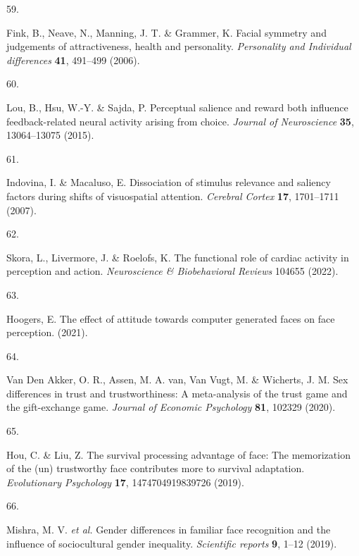 \documentclass[
  man,floatsintext]{apa6}
\newlength{\cslhangindent}
\newlength{\csllabelwidth}
\newlength{\cslentryspacingunit} %
\newenvironment{CSLReferences}[2] %
 {%
  \setlength{\parindent}{0pt}
  \ifodd #1
  \let\oldpar\par
  \def\par{\hangindent=\cslhangindent\oldpar}
  \fi
  \setlength{\parskip}{#2\cslentryspacingunit}
 }%
 {}
\newcommand{\CSLLeftMargin}[1]{\parbox[t]{\csllabelwidth}{#1}}
\newcommand{\CSLRightInline}[1]{\parbox[t]{\linewidth - \csllabelwidth}{#1}\break}
\begin{document}
\begin{CSLReferences}{0}{0}
\leavevmode{}%
\CSLLeftMargin{59. }%
\CSLRightInline{Fink, B., Neave, N., Manning, J. T. \& Grammer, K. Facial symmetry and judgements of attractiveness, health and personality. \emph{Personality and Individual differences} \textbf{41}, 491--499 (2006).}

\leavevmode{}%
\CSLLeftMargin{60. }%
\CSLRightInline{Lou, B., Hsu, W.-Y. \& Sajda, P. Perceptual salience and reward both influence feedback-related neural activity arising from choice. \emph{Journal of Neuroscience} \textbf{35}, 13064--13075 (2015).}

\leavevmode{}%
\CSLLeftMargin{61. }%
\CSLRightInline{Indovina, I. \& Macaluso, E. Dissociation of stimulus relevance and saliency factors during shifts of visuospatial attention. \emph{Cerebral Cortex} \textbf{17}, 1701--1711 (2007).}

\leavevmode{}%
\CSLLeftMargin{62. }%
\CSLRightInline{Skora, L., Livermore, J. \& Roelofs, K. The functional role of cardiac activity in perception and action. \emph{Neuroscience \& Biobehavioral Reviews} 104655 (2022).}

\leavevmode{}%
\CSLLeftMargin{63. }%
\CSLRightInline{Hoogers, E. The effect of attitude towards computer generated faces on face perception. (2021).}

\leavevmode{}%
\CSLLeftMargin{64. }%
\CSLRightInline{Van Den Akker, O. R., Assen, M. A. van, Van Vugt, M. \& Wicherts, J. M. Sex differences in trust and trustworthiness: A meta-analysis of the trust game and the gift-exchange game. \emph{Journal of Economic Psychology} \textbf{81}, 102329 (2020).}

\leavevmode{}%
\CSLLeftMargin{65. }%
\CSLRightInline{Hou, C. \& Liu, Z. The survival processing advantage of face: The memorization of the (un) trustworthy face contributes more to survival adaptation. \emph{Evolutionary Psychology} \textbf{17}, 1474704919839726 (2019).}

\leavevmode{}%
\CSLLeftMargin{66. }%
\CSLRightInline{Mishra, M. V. \emph{et al.} Gender differences in familiar face recognition and the influence of sociocultural gender inequality. \emph{Scientific reports} \textbf{9}, 1--12 (2019).}


\end{CSLReferences}
\end{document}
